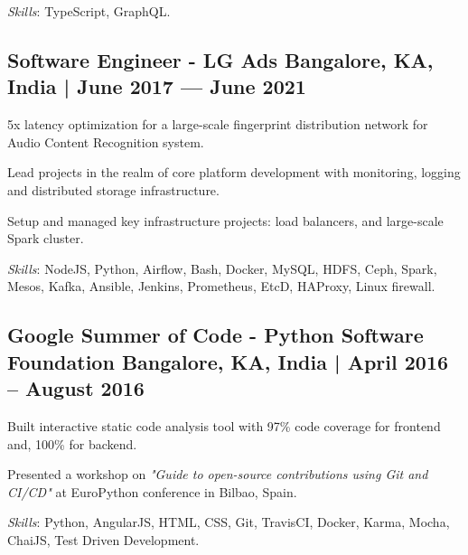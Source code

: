 \textit{Skills}: TypeScript, GraphQL.
\vspace*{1mm}

\subsection{{Software Engineer - LG Ads \hfill Bangalore, KA, India | June 2017 --- June 2021}}
\begin{zitemize}
\item 5x latency optimization for a large-scale fingerprint distribution network for Audio Content Recognition system.
\item Lead projects in the realm of core platform development with monitoring, logging and distributed storage infrastructure. 
\item Setup and managed key infrastructure projects: load balancers, and large-scale Spark cluster.
\end{zitemize}

\textit{Skills}: NodeJS, Python, Airflow, Bash, Docker, MySQL, HDFS, Ceph, Spark, Mesos, Kafka, Ansible, Jenkins, Prometheus, EtcD, HAProxy, Linux firewall.
\vspace*{1mm}

\subsection{{Google Summer of Code - Python Software Foundation \hfill Bangalore, KA, India | April 2016 -- August 2016}}
\begin{zitemize}
\item Built interactive static code analysis tool with 97\% code coverage for frontend and, 100\% for backend.
\item Presented a workshop on \textit{"Guide to open-source contributions using Git and CI/CD"} at EuroPython conference in Bilbao, Spain.
\end{zitemize}
\textit{Skills}: Python, AngularJS, HTML, CSS, Git, TravisCI, Docker, Karma, Mocha, ChaiJS, Test Driven Development.
